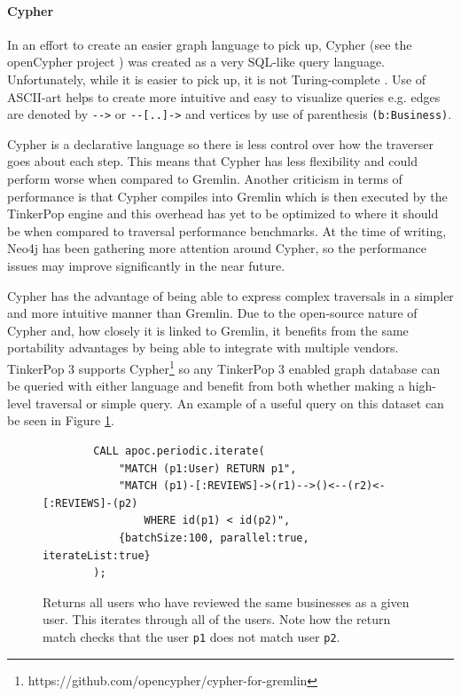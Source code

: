 \paragraph{Cypher}

In an effort to create an easier graph language to pick up, Cypher (see the openCypher project \cite{opencypher}) was created as a very SQL-like query language. Unfortunately, while it is easier to pick up, it is not Turing-complete \cite{modern-graph-query-lang}. Use of ASCII-art helps to create more intuitive and easy to visualize queries e.g. edges are denoted by \verb|-->| or \verb|--[..]->| and vertices by use of parenthesis \verb|(b:Business)|.

Cypher is a declarative language so there is less control over how the traverser goes about each step. This means that Cypher has less flexibility and could perform worse when compared to Gremlin. Another criticism in terms of performance is that Cypher compiles into Gremlin which is then executed by the TinkerPop engine \cite{backtothefuture} and this overhead has yet to be optimized to where it should be when compared to traversal performance benchmarks. At the time of writing, Neo4j has been gathering more attention around Cypher, so the performance issues may improve significantly in the near future.

Cypher has the advantage of being able to express complex traversals in a simpler and more intuitive manner than Gremlin. Due to the open-source nature of Cypher and, how closely it is linked to Gremlin, it benefits from the same portability advantages by being able to integrate with multiple vendors. TinkerPop 3 supports Cypher\footnote{https://github.com/opencypher/cypher-for-gremlin} so any TinkerPop 3 enabled graph database can be queried with either language and benefit from both whether making a high-level traversal or simple query. An example of a useful query on this dataset can be seen in Figure \ref{lst:cypher-example-1}.

\begin{figure}[h]
    \centering
    \begin{verbatim}
        CALL apoc.periodic.iterate(
            "MATCH (p1:User) RETURN p1",
            "MATCH (p1)-[:REVIEWS]->(r1)-->()<--(r2)<-[:REVIEWS]-(p2)
                WHERE id(p1) < id(p2)",
            {batchSize:100, parallel:true, iterateList:true}
        );
    \end{verbatim}
    \caption{Returns all users who have reviewed the same businesses as a given user. This iterates through all of the users. Note how the return match checks that the user \texttt{p1} does not match user \texttt{p2}.}
    \label{lst:cypher-example-1}
\end{figure}

